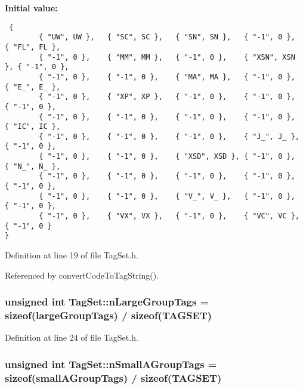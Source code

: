 \textbf{Initial value:}

\begin{Code}\begin{verbatim} {
        { "UW", UW },   { "SC", SC },   { "SN", SN },   { "-1", 0 },    { "FL", FL },
        { "-1", 0 },    { "MM", MM },   { "-1", 0 },    { "XSN", XSN }, { "-1", 0 },
        { "-1", 0 },    { "-1", 0 },    { "MA", MA },   { "-1", 0 },    { "E_", E_ },
        { "-1", 0 },    { "XP", XP },   { "-1", 0 },    { "-1", 0 },    { "-1", 0 },
        { "-1", 0 },    { "-1", 0 },    { "-1", 0 },    { "-1", 0 },    { "IC", IC },
        { "-1", 0 },    { "-1", 0 },    { "-1", 0 },    { "J_", J_ },   { "-1", 0 },
        { "-1", 0 },    { "-1", 0 },    { "XSD", XSD }, { "-1", 0 },    { "N_", N_ },
        { "-1", 0 },    { "-1", 0 },    { "-1", 0 },    { "-1", 0 },    { "-1", 0 },
        { "-1", 0 },    { "-1", 0 },    { "V_", V_ },   { "-1", 0 },    { "-1", 0 },
        { "-1", 0 },    { "VX", VX },   { "-1", 0 },    { "VC", VC },   { "-1", 0 }
}
\end{verbatim}
\end{Code}


Definition at line 19 of file TagSet.h.

Referenced by convertCodeToTagString().\hypertarget{classkmaOrange_1_1TagSet_277bde9aabfe64d44592a28639e7dd5b}{
\subsubsection[{nLargeGroupTags}]{\setlength{\rightskip}{0pt plus 5cm}unsigned int {\bf TagSet::nLargeGroupTags} = sizeof({\bf largeGroupTags}) / sizeof({\bf TAGSET})}}
\label{classkmaOrange_1_1TagSet_277bde9aabfe64d44592a28639e7dd5b}




Definition at line 24 of file TagSet.h.\hypertarget{classkmaOrange_1_1TagSet_1b8ca1eea8dfbbf8c12adb1481f3bfd3}{
\subsubsection[{nSmallAGroupTags}]{\setlength{\rightskip}{0pt plus 5cm}unsigned int {\bf TagSet::nSmallAGroupTags} = sizeof({\bf smallAGroupTags}) / sizeof({\bf TAGSET})}}
\label{classkmaOrange_1_1TagSet_1b8ca1eea8dfbbf8c12adb1481f3bfd3}




